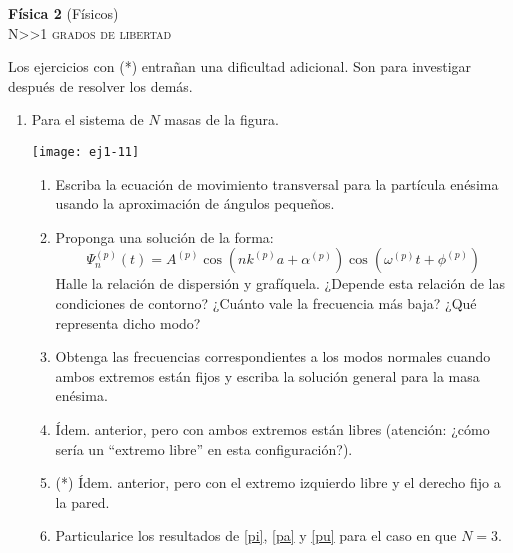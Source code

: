 \documentclass[11pt,spanish,a4paper]{article}
\begin{document}
\begin{center}
\textbf{Física 2} (Físicos) \hfill {}\\
	\textsc{\LARGE N\textgreater\textgreater1 grados de libertad}
\end{center}

Los ejercicios con (*) entrañan una dificultad adicional. Son para investigar después de resolver los demás.


\begin{enumerate}


\item \label{anterior}
\begin{minipage}[t][1cm]{0.45\textwidth}
Para el sistema de $N$ masas de la figura. 
\end{minipage}
\begin{minipage}[c][1.5cm][t]{0.5\textwidth}
  \texttt{[image: ej1-11]}
\end{minipage}
\begin{enumerate}
	\item Escriba la ecuación de movimiento transversal para la partícula enésima usando la aproximación de ángulos pequeños.
	\item Proponga una solución de la forma:
	\[
		\Psi_{n}^{(p)}(t)=A^{(p)}\cos\left(nk^{(p)}a+\alpha^{(p)}\right)\cos\left(\omega^{(p)}t+\phi^{(p)}\right)
	\]
	Halle la relación de dispersión y grafíquela.
	¿Depende esta relación de las condiciones de contorno?
	¿Cuánto vale la frecuencia más baja?
	¿Qué representa dicho modo? 
	\item \label{pi} Obtenga las frecuencias correspondientes a los modos normales cuando ambos extremos están fijos y escriba la solución general para la masa enésima. 
	\item \label{pa} Ídem. anterior, pero con ambos extremos están libres (atención: ¿cómo sería un ``extremo libre'' en esta configuración?).
	\item \label{pu} (*) Ídem. anterior, pero con el extremo izquierdo libre y el derecho fijo a la pared. 
	\item Particularice los resultados de \ref{pi}, \ref{pa} y \ref{pu} para el caso en que \(N = 3\).
\end{enumerate}




\end{enumerate}
\end{document}
